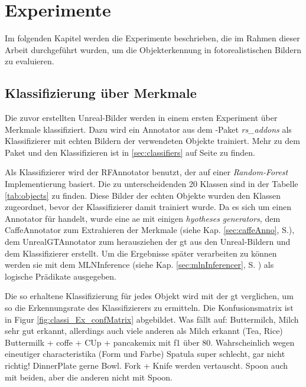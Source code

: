 \graphicspath{{./images/}}      
\def\CHAPTERONE{./chapters/Chapter-1} 

\chapter{Experimente}
\label{chap:experiments}
%	

Im folgenden Kapitel werden die Experimente beschrieben, die im Rahmen dieser Arbeit durchgeführt wurden, um die Objekterkennung in fotorealistischen Bildern zu evaluieren.  


\section{Klassifizierung über Merkmale}
\label{sec:classificationExperiment}
Die zuvor erstellten Unreal-Bilder werden in einem ersten Experiment über Merkmale klassifiziert. Dazu wird ein Annotator aus dem \robosherlock-Paket \textit{rs\_addons} als Klassifizierer mit echten Bildern der verwendeten Objekte trainiert. Mehr zu dem Paket und den Klassifizieren ist in \ref{sec:classifiers} auf Seite \pageref{sec:classifiers} zu finden. \par

Als Klassifizierer wird der RFAnnotator benutzt, der auf einer \textit{Random-Forest} Implementierung basiert. Die zu unterscheidenden 20 Klassen sind in der Tabelle \ref{tab:objects} zu finden. Diese Bilder der echten Objekte wurden den Klassen zugeordnet, bevor der Klassifizierer damit trainiert wurde. Da es sich um einen Annotator für \robosherlock handelt, wurde eine \gls{ae} mit einigen \textit{hyotheses generators}, dem CaffeAnnotator zum Extrahieren der Merkmale (siehe Kap. \ref{sec:caffeAnno}, S.\pageref{sec:caffeAnno}), dem UnrealGTAnnotator zum herausziehen der \gls{gt} aus den Unreal-Bildern und dem Klassifizierer erstellt. Um die Ergebnisse später verarbeiten zu können werden sie mit dem MLNInference (siehe Kap. \ref{sec:mlnInferencer}, S. \pageref{sec:mlnInferencer}) als logische Prädikate ausgegeben. \par
 
Die so erhaltene Klassifizierung für jedes Objekt wird mit der \gls{gt} verglichen, um so die Erkennungsrate des Klassifizierers zu ermitteln. Die Konfusionsmatrix ist in Figur \ref{fig:classi_Ex_confMatrix} abgebildet. Was fällt auf: Buttermilch, Milch sehr gut erkannt, allerdings auch viele anderen als Milch erkannt (Tea, Rice) Buttermilk + coffe + CUp + pancakemix mit f1 über 80. Wahrscheinlich wegen eineutiger characteristika (Form und Farbe) Spatula super schlecht, gar nicht richtig! DinnerPlate gerne Bowl. Fork + Knife werden vertauscht. Spoon auch mit beiden, aber die anderen nicht mit Spoon. 


